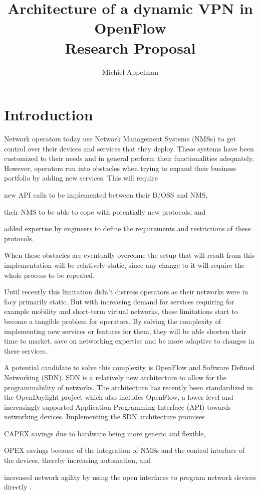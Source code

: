\documentclass[oneside,twocolumn,8pt,a4paper]{article}
\title{Architecture of a dynamic VPN in OpenFlow \\[0.3cm]
\large{Research Proposal}}
\author{Michiel Appelman}
\begin{document}
	\maketitle
	
	\section{Introduction} %
	\label{sec:introduction}
	Network operators today use Network Management Systems (NMSs) to get control over their devices and services that they deploy. These systems have been customized to their needs and in general perform their functionalities adequately. However, operators run into obstacles when trying to expand their business portfolio by adding new services. This will require 
	\begin{inparaenum}
		\item new API calls to be implemented between their B/OSS and NMS, 
		\item their NMS to be able to cope with potentially new protocols, and
		\item added expertise by engineers to define the requirements and restrictions of these protocols. 
	\end{inparaenum}
	When these obstacles are eventually overcome the setup that will result from this implementation will be relatively static, since any change to it will require the whole process to be repeated.

	Until recently this limitation didn't distress operators as their networks were in facy primarily static. But with increasing demand for services requiring for example mobility and short-term virtual networks, these limitations start to become a tangible problem for operators. By solving the complexity of implementing new services or features for them, they will be able shorten their time to market, save on networking expertise and be more adaptive to changes in these services. 
	
	A potential candidate to solve this complexity is OpenFlow \cite{openflow} and Software Defined Networking (SDN). SDN is a relatively new architecture to allow for the programmability of networks. The architecture has recently been standardized in the OpenDaylight project \cite{opendaylight} which also includes OpenFlow, a lower level and increasingly supported Application Programming Interface (API) towards networking devices. Implementing the SDN architecture promises
	\begin{inparaenum}
		\item CAPEX savings due to hardware being more generic and flexible,
		\item OPEX savings because of the integration of NMSs and the control interface of the devices, thereby increasing automation, and
		\item increased network agility by using the open interfaces to program network devices directly \cite{packet-circuit}.
\end{inparaenum} 
			
\end{document}
